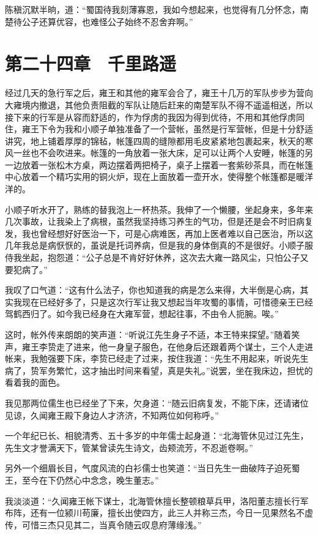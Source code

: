 陈稹沉默半晌，道：“蜀国待我刻薄寡恩，我如今想起来，也觉得有几分怀念，南楚待公子还算优容，也难怪公子始终不忍舍弃啊。”

\chapter{第二十四章　千里路遥}

经过几天的急行军之后，雍王和其他的雍军会合了，雍王十几万的军队步步为营向大雍境内撤退，其他负责阻截的军队让随后赶来的南楚军队不得不遥遥相送，所以接下来的行军是从容而舒适的，作为俘虏的我因为得到优待，不用和其他俘虏同住，雍王下令为我和小顺子单独准备了一个营帐，虽然是行军营帐，但是十分舒适讲究，地上铺着厚厚的锦毡，帐篷四周的缝隙都用毛皮紧紧地包裹起来，秋天的寒风一丝也不会吹进来。帐篷的一角放着一张大床，足可以让两个人安睡，帐篷的另一边放着一张松木方桌，两边摆着两把椅子，桌子上摆着一套紫砂茶具，而在帐篷中心放着一个精巧实用的铜火炉，现在上面放着一壶开水，使得整个帐篷都是暖洋洋的。

小顺子听水开了，熟练的替我泡上一杯热茶。我伸了一个懒腰，坐起身来，多年来几次事故，让我染上了病根，虽然我坚持练习养生的气功，但是还是会不时旧病复发，我也曾经想好好医治一下，可是心病难医，再加上医者难以自己医治，所以这几年我总是病恹恹的，虽说是托词养病，但是我的身体倒真的不是很好。小顺子服侍我坐起，抱怨道：“公子总是不肯好好休养，这次去大雍一路风尘，只怕公子又要犯病了。”

我叹了口气道：“这有什么法子，你也知道我的病是怎么来得，大半倒是心病，其实我现在已经好多了，只是这次行军让我又想起当年攻蜀的事情，可惜德亲王已经驾鹤西归了。如今我已经身在大雍军营，想起往事，不由令人扼腕。唉。”

这时，帐外传来朗朗的笑声道：“听说江先生身子不适，本王特来探望。”随着笑声，雍王李贽走了进来，他一身皇子服色，在他身后还跟着两个谋士，三个人走进帐来，我勉强要下床，李贽已经走了过来，按住我道：“先生不用起来，听说先生病了，贽军务繁忙，这才抽出时间来看望，真是失礼。”说罢，坐在我床边，担忧的看着我的面色。

我见那两位儒生也已经坐了下来，欠身道：“随云旧病复发，不能下床，还请诸位见谅，久闻雍王殿下身边人才济济，不知两位如何称呼。”

一个年纪已长、相貌清秀、五十多岁的中年儒士起身道：“北海管休见过江先生，先生文才誉满天下，管某曾读先生诗文，齿颊流芳，不忍逝卷啊。”

另外一个细眉长目，气度风流的白衫儒士也笑道：“当日先生一曲破阵子迫死蜀王，至今在下仍然心中念念，晚生董志。”

我淡淡道：“久闻雍王帐下谋士，北海管休擅长整顿粮草兵甲，洛阳董志擅长行军布阵，还有一位颍川苟廉，擅长出使四方，此三人并称三杰，今日一见果然名不虚传，可惜三杰只见其二，当真令随云叹息府薄缘浅。”

